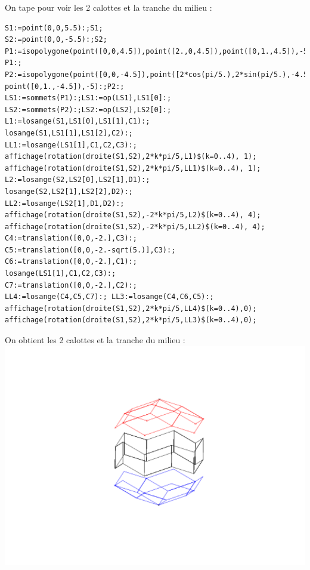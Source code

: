 \documentclass[a4paper,11pt]{book}
\begin{document}
On tape pour voir les 2 calottes et la tranche du milieu :
\begin{verbatim}
S1:=point(0,0,5.5):;S1;
S2:=point(0,0,-5.5):;S2;
P1:=isopolygone(point([0,0,4.5]),point([2.,0,4.5]),point([0,1.,4.5]),-5):;
P1:;
P2:=isopolygone(point([0,0,-4.5]),point([2*cos(pi/5.),2*sin(pi/5.),-4.5]), 
point([0,1.,-4.5]),-5):;P2:;
LS1:=sommets(P1):;LS1:=op(LS1),LS1[0]:;
LS2:=sommets(P2):;LS2:=op(LS2),LS2[0]:;
L1:=losange(S1,LS1[0],LS1[1],C1):;
losange(S1,LS1[1],LS1[2],C2):;
LL1:=losange(LS1[1],C1,C2,C3):;
affichage(rotation(droite(S1,S2),2*k*pi/5,L1)$(k=0..4), 1);
affichage(rotation(droite(S1,S2),2*k*pi/5,LL1)$(k=0..4), 1);
L2:=losange(S2,LS2[0],LS2[1],D1):;
losange(S2,LS2[1],LS2[2],D2):;
LL2:=losange(LS2[1],D1,D2):;
affichage(rotation(droite(S1,S2),-2*k*pi/5,L2)$(k=0..4), 4);
affichage(rotation(droite(S1,S2),-2*k*pi/5,LL2)$(k=0..4), 4);
C4:=translation([0,0,-2.],C3):;
C5:=translation([0,0,-2.-sqrt(5.)],C3):;
C6:=translation([0,0,-2.],C1):;
losange(LS1[1],C1,C2,C3):;
C7:=translation([0,0,-2.],C2):;
LL4:=losange(C4,C5,C7):; LL3:=losange(C4,C6,C5):;
affichage(rotation(droite(S1,S2),2*k*pi/5,LL4)$(k=0..4),0);
affichage(rotation(droite(S1,S2),2*k*pi/5,LL3)$(k=0..4),0);
\end{verbatim}
On obtient les 2 calottes et la tranche du milieu :\\
\includegraphics[width=\textwidth]{triacon5}\\
\end{document}
